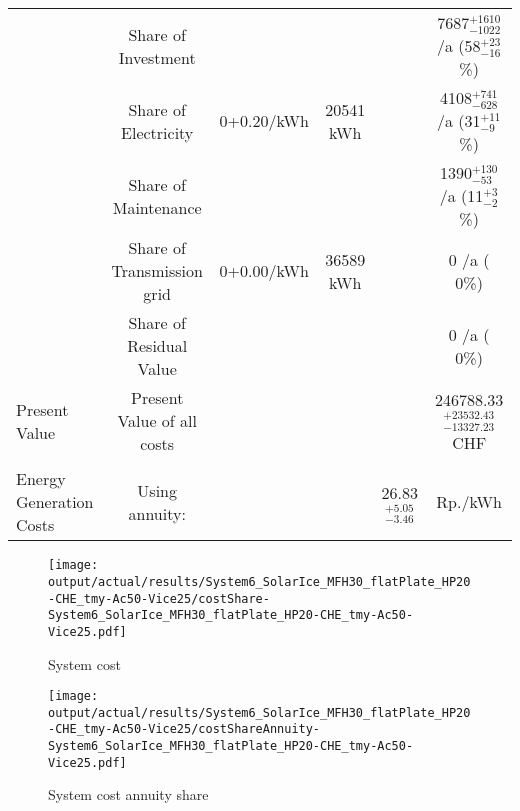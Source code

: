 \documentclass[english]{SPFShortReport}
\begin{document}
\begin{table}[!ht]
\begin{adjustbox}{max width =\textwidth}
\begin{tabular}{l | c c c c c }
 & Share of Investment & &&& 7687$^{\mathrm{+1610}}_{\mathrm{-1022}}$ /a (58$^{\mathrm{+23}}_{\mathrm{-16}}$\%) \\
 & Share of Electricity & 0+0.20/kWh & 20541 kWh &  & 4108$^{\mathrm{+741}}_{\mathrm{-628}}$ /a (31$^{\mathrm{+11}}_{\mathrm{- 9}}$\%)\\
 & Share of Maintenance & &&& 1390$^{\mathrm{+130}}_{\mathrm{-53}}$ /a (11$^{\mathrm{+ 3}}_{\mathrm{- 2}}$\%)\\ 
 & Share of Transmission grid & 0+0.00/kWh & 36589 kWh & &  0 /a ( 0\%)\\
 & Share of Residual Value &&& &  0 /a ( 0\%)\\
Present Value  & Present Value of all costs  & &&& 246788.33$^{\mathrm{+23532.43}}_{\mathrm{-13327.23}}$ CHF \\
\hline \\ 
 Energy Generation Costs & Using annuity: &&& 26.83$^{\mathrm{+5.05}}_{\mathrm{-3.46}}$ & Rp./kWh \\
\hline
\hline
\end{tabular}
\end{adjustbox}
\label{CostsTable}
\end{table}
\begin{figure}[!htbp]
\begin{center}
\texttt{[image: output/actual/results/System6\_SolarIce\_MFH30\_flatPlate\_HP20-CHE\_tmy-Ac50-Vice25/costShare-System6\_SolarIce\_MFH30\_flatPlate\_HP20-CHE\_tmy-Ac50-Vice25.pdf]}
\caption{System cost}
\label{systemCost}
\end{center}
\end{figure}
\begin{figure}[!htbp]
\begin{center}
\texttt{[image: output/actual/results/System6\_SolarIce\_MFH30\_flatPlate\_HP20-CHE\_tmy-Ac50-Vice25/costShareAnnuity-System6\_SolarIce\_MFH30\_flatPlate\_HP20-CHE\_tmy-Ac50-Vice25.pdf]}
\caption{System cost annuity share}
\label{systemCostannuity}
\end{center}
\end{figure}
\end{document}
